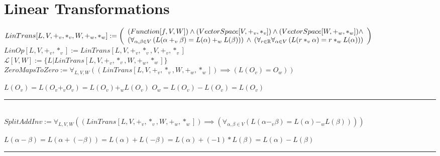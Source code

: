 \documentclass{book}
\newcommand{\abr}{:=}
\newcommand{\pr}[1]{\left(#1\right)}
\begin{document}
\section{Linear Transformations}
$LinTrans[L, V, +_v, *_v, W, +_w, *_w] \abr \left(\begin{array}{ll}
  (Function[f, V, W]) \hfill \land \hfill (VectorSpace[V, +_v, *_v]) \hfill \land \hfill (VectorSpace[W, +_w, *_w]) \hfill \land \hfill \\
  \pr{\forall_{\alpha, \beta \in V}\pr{L(\alpha +_v \beta) = L(\alpha) +_w L(\beta)}} \hfill \land \hfill \pr{\forall_{r \in \mathbb{R}} \forall_{\alpha \in V}\pr{L(r *_v \alpha) = r *_w L(\alpha)}}
\end{array}\right)$ \\
$LinOp[L, V, +_v, *_v] \abr LinTrans[L, V, +_v, *_v, V, +_v, *_v]$ \\
$\mathcal{L}[V, W] \abr \{L | LinTrans[L, V, +_v, *_v, W, +_w, *_w]\}$ \\

$ZeroMapsToZero \abr \forall_{L, V, W}\pr{(LinTrans[L, V, +_v, *_v, W, +_w, *_w]) \implies \pr{L(O_v) = O_w}}$
\begin{enumerate}
  \lit $L(O_v) = L(O_v +_v O_v) = L(O_v) +_w L(O_v)$
  \lit $O_w = L(O_v) - L(O_v) = L(O_v)$
\end{enumerate} \vspace{.75mm} \hrule \vspace{.75mm} \ \\ 

$SplitAddInv \abr \forall_{L, V, W}\pr{(LinTrans[L, V, +_v, *_v, W, +_w, *_w]) \implies \pr{\forall_{\alpha, \beta \in V}\pr{L(\alpha -_v \beta) = L(\alpha) -_w L(\beta)}}}$
\begin{enumerate}
  \lit $L(\alpha - \beta) = L\pr{\alpha + (-\beta)} = L(\alpha) + L(-\beta) = L(\alpha) + (-1) * L(\beta) = L(\alpha) - L(\beta)$
\end{enumerate} \vspace{.75mm} \hrule \vspace{.75mm} \ \\ 
\end{document}
